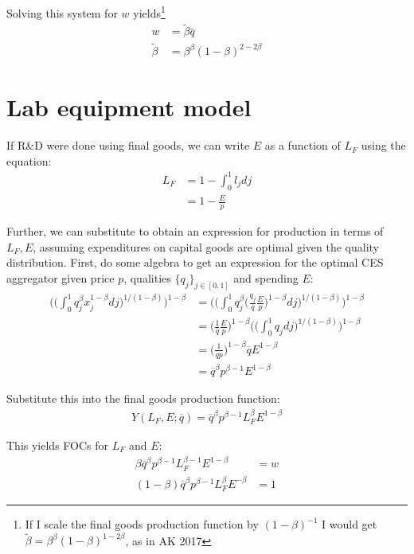 \documentclass[12pt,english]{article}
\theoremstyle{remark}
\begin{document}
Solving this system for $w$ yields\footnote{If I scale the final goods production function by $(1-\beta)^{-1}$ I would get $\tilde{\beta} = \beta^{\beta}(1-\beta)^{1-2\beta}$, as in AK 2017}
\begin{align}
	w &= \tilde{\beta}\bar{q} \\
	\tilde{\beta}  &= \beta^{\beta} (1-\beta)^{2 - 2\beta}
\end{align}


\break
\section{Lab equipment model} If R\&D were done using final goods, we can write $E$ as a function of $L_F$ using the equation:
\begin{align*}
L_F &= 1 - \int_0^1 l_j dj \\
	&= 1- \frac{E}{p}
\end{align*}

Further, we can substitute to obtain an expression for production in terms of $L_F,E$, assuming expenditures on capital goods are optimal given the quality distribution. First, do some algebra to get an expression for the optimal CES aggregator given price $p$, qualities $\{q_j\}_{j \in [0,1]}$ and spending $E$: 
\begin{align*}
\Big(\big(\int_0^1 q_j^{\beta} x_j^{1-\beta} dj \big)^{1/(1-\beta)} \Big)^{1-\beta} &= \Big(\big(\int_0^1 q_j^{\beta} \big(\frac{q_j}{\overline{q}}\frac{E}{p}\big)^{1-\beta} dj\big)^{1/(1-\beta)} \Big)^{1-\beta} \\
&= \big(\frac{1}{\overline{q}}\frac{E}{p}\big)^{1-\beta} \Big(\big(\int_0^1 q_j dj \big)^{1/(1-\beta)} \Big)^{1-\beta} \\
&= \big(\frac{1}{\overline{q}p}\big)^{1-\beta} \overline{q} E^{1-\beta} \\
&= \overline{q}^{\beta} p^{\beta - 1} E^{1-\beta}
\end{align*}

Substitute this into the final goods production function:
\begin{align*}
Y(L_F,E;\overline{q}) = \overline{q}^{\beta} p^{\beta - 1} L_F^{\beta} E^{1-\beta}
\end{align*}

This yields FOCs for $L_F$ and $E$:
\begin{align*}
\beta \overline{q}^{\beta} p^{\beta - 1} L_F^{\beta -1} E^{1-\beta} &= w \\ 
(1-\beta) \overline{q}^{\beta} p^{\beta - 1} L_F^{\beta} E^{-\beta} &= 1 
\end{align*}
\end{document}
